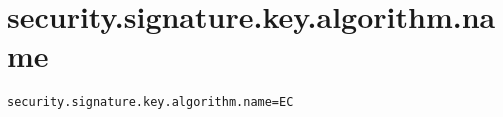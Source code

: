 \section{security.signature.key.algorithm.name}
\label{configuration:SecuritySignatureKeyAlgorithmName}
\ClearAPI
\TODO
{}
\begin{lstlisting}[style=Props,caption={Usage example for \textit{security.signature.key.algorithm.name}}]
security.signature.key.algorithm.name=EC
\end{lstlisting}
